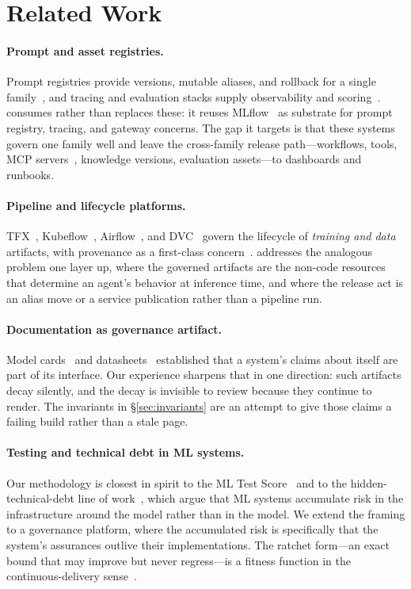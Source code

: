 \documentclass{article}
\begin{document}
\section{Related Work}

\paragraph{Prompt and asset registries.} Prompt registries provide versions,
mutable aliases, and rollback for a single
family~\cite{mlflowpromptregistry,langsmithprompts,langfuseprompts}, and tracing and
evaluation stacks supply observability and
scoring~\cite{mlflowgenai,phoenix,promptfoo,openaievals}. \sys consumes rather than
replaces these: it reuses MLflow~\cite{zaharia2018mlflow} as substrate for prompt
registry, tracing, and gateway concerns. The gap it targets is that these systems
govern one family well and leave the cross-family release path---workflows, tools,
MCP servers~\cite{mcp2024}, knowledge versions, evaluation assets---to dashboards and
runbooks.

\paragraph{Pipeline and lifecycle platforms.} TFX~\cite{baylor2017tfx},
Kubeflow~\cite{kubeflow}, Airflow~\cite{airflow}, and DVC~\cite{dvc} govern the
lifecycle of \emph{training and data} artifacts, with provenance as a first-class
concern~\cite{schelter2017provenance}. \sys addresses the analogous problem one
layer up, where the governed artifacts are the non-code resources that determine an
agent's behavior at inference time, and where the release act is an alias move or a
service publication rather than a pipeline run.

\paragraph{Documentation as governance artifact.} Model cards~\cite{mitchell2019modelcards}
and datasheets~\cite{gebru2021datasheets} established that a system's claims about
itself are part of its interface. Our experience sharpens that in one direction: such
artifacts decay silently, and the decay is invisible to review because they continue
to render. The invariants in \S\ref{sec:invariants} are an attempt to give those
claims a failing build rather than a stale page.

\paragraph{Testing and technical debt in ML systems.} Our methodology is closest in
spirit to the ML Test Score~\cite{breck2017mltest} and to the hidden-technical-debt
line of work~\cite{sculley2015debt,amershi2019se4ml}, which argue that ML systems
accumulate risk in the infrastructure around the model rather than in the model. We
extend the framing to a governance platform, where the accumulated risk is
specifically that the system's assurances outlive their implementations. The ratchet
form---an exact bound that may improve but never regress---is a fitness function in
the continuous-delivery sense~\cite{humble2010cd,beyer2016sre}.
\end{document}

